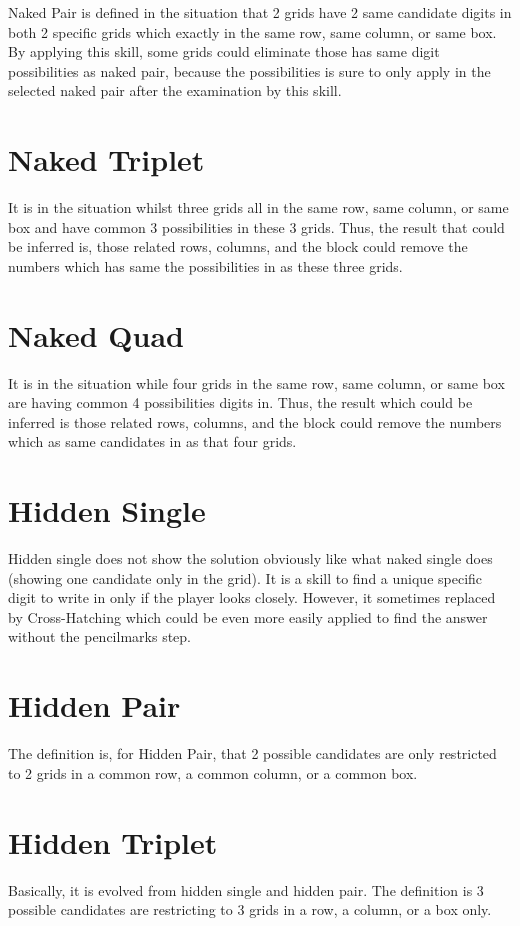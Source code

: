 \documentclass[11pt]{report}
\begin{document}
Naked Pair is defined in the situation that 2 grids have 2 same candidate digits in both 2 specific grids which exactly in the same row, same column, or same box. By applying this skill, some grids could eliminate those has same digit possibilities as naked pair, because the possibilities is sure to only apply in the selected naked pair after the examination by this skill.

\section{Naked Triplet}
\label{sec:Naked Triplet}
It is in the situation whilst three grids all in the same row, same column, or same box and have common 3 possibilities in these 3 grids. Thus, the result that could be inferred is, those related rows, columns, and the block could remove the numbers which has same the possibilities in as these three grids.

\section{Naked Quad}
\label{sec:Naked Quad}
It is in the situation while four grids in the same row, same column, or same box are having common 4 possibilities digits in. Thus, the result which could be inferred is those related rows, columns, and the block could remove the numbers which as same candidates in as that four grids.

\section{Hidden Single}
\label{sec:Hidden Single}
Hidden single does not show the solution obviously like what naked single does (showing one candidate only in the grid). It is a skill to find a unique specific digit to write in only if the player looks closely. However, it sometimes replaced by Cross-Hatching which could be even more easily applied to find the answer without the pencilmarks step. 

\section{Hidden Pair}
\label{sec:Hidden Pair}
The definition is, for Hidden Pair, that 2 possible candidates are only restricted to 2 grids in a common row, a common column, or a common box. 

\section{Hidden Triplet}
\label{sec:Hidden Triplet}
Basically, it is evolved from hidden single and hidden pair. The definition is 3 possible candidates are restricting to 3 grids in a row, a column, or a box only.
\end{document}
